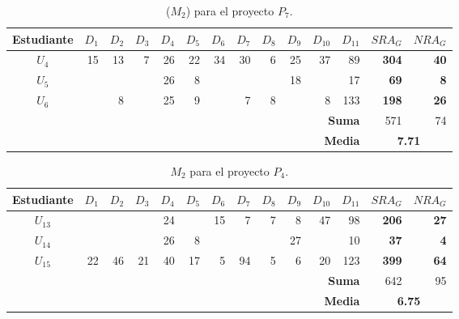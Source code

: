 \begin{table}[h]
\centering
\begin{tabular}{|c|r|r|r|r|r|r|r|r|r|r|r|r|r|}
\hline
\textbf{Estudiante} & \textbf{$D_1$} & \textbf{$D_2$} & \textbf{$D_3$} & \textbf{$D_4$} & \textbf{$D_5$} & \textbf{$D_6$} & \textbf{$D_7$} & \textbf{$D_8$} & \textbf{$D_9$} & \textbf{$D_{10}$} & \textbf{$D_{11}$} &  \textbf{$SRA_G$ } & \textbf{$NRA_G$ } \\ \hline
\hline
$U_4$ & 15  & 13  & 7  & 26 & 22 & 34  & 30 & 6   & 25  & 37 & 89  & \textbf{304} & \textbf{40} \\ \hline
$U_5$ &      &      &     & 26 & 8   &      &      &      &  18 &      & 17 &  \textbf{69}  & \textbf{8} \\ \hline
$U_6$ &     &  8    &    &  25 & 9  &     &   7   &  8   &      &  8  &  133 & \textbf{198} & \textbf{26} \\ \hline
\hline
\hline
\multicolumn{12}{|r|}{\textbf{Suma}} & 571 &  74 \\ \hline
\multicolumn{12}{|r|}{\textbf{Media}} & \multicolumn{2}{|c|}{\textbf{7.71}} \\ \hline
\end{tabular}
\caption{($M_2$) para el proyecto $P_{7}$.}
\label{table:7-project-peers-grades}
\end{table}

\begin{table}[h]
\centering
\begin{tabular}{|c|r|r|r|r|r|r|r|r|r|r|r|r|r|}
\hline
\textbf{Estudiante} & \textbf{$D_1$} & \textbf{$D_2$} & \textbf{$D_3$} & \textbf{$D_4$} & \textbf{$D_5$} & \textbf{$D_6$} & \textbf{$D_7$} & \textbf{$D_8$} & \textbf{$D_9$} & \textbf{$D_{10}$} & \textbf{$D_{11}$} &  \textbf{$SRA_G$ } & \textbf{$NRA_G$ } \\ \hline
\hline
$U_{13}$ &   &   &   & 24 &      & 15  & 7   & 7   & 8   & 47  & 98  & \textbf{206} & \textbf{27} \\ \hline
$U_{14}$ &   &   &   & 26 & 8   &      &      &      &  27 &      & 10 &  \textbf{37}  & \textbf{4} \\ \hline
$U_{15}$ & 22 &  46 & 21   &  40 & 17  & 5 & 94 &  5   & 6  &  20  &  123 & \textbf{399} & \textbf{64} \\ \hline
\hline
\hline
\multicolumn{12}{|r|}{\textbf{Suma}} & 642 &  95 \\ \hline
\multicolumn{12}{|r|}{\textbf{Media}} & \multicolumn{2}{|c|}{\textbf{6.75}} \\ \hline
\end{tabular}
\caption{$M_2$  para el proyecto $P_{4}$.}
\label{table:4-project-peers-grades}
\end{table}

